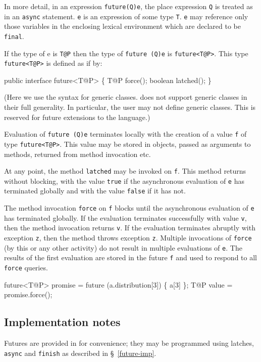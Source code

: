 In more detail, in an expression {\tt future(Q){e}}, the place
expression {\tt Q} is treated as in an {\tt async} statement. {\tt e}
is an expression of some type {\tt T}. {\tt e} may reference only
those variables in the enclosing lexical environment which are
declared to be {\tt final}.

If the type of {\cf e} is {\tt T@P} then the type of
{\tt future (Q){e}} is {\tt future<T@P>}.  This 
type {\tt future<T@P>} is defined as if by:
\begin{x10}
public interface future<T@P> \{
  T@P force();
  boolean latched();
\}
\end{x10}

(Here we use the syntax for generic classes. \XtenCurrVer{} does not support
generic classes in their full generality. In particular, the user may
not define generic classes. This is reserved for future extensions to the
language.)

Evaluation of {\tt future (Q){e}} terminates locally with the creation
of a value {\tt f} of type {\tt future<T@P>}.  This value may be
stored in objects, passed as arguments to methods, returned from
method invocation etc. 

At any point, the method {\tt latched} may be invoked on {\tt f}. This
method returns without blocking, with the value {\tt true} if the
asynchronous evaluation of {\tt e} has terminated globally and with
the value {\tt false} if it has not.

The method invocation {\tt force} on {\tt f} blocks until the
asynchronous evaluation of {\tt e} has terminated globally. If the
evaluation terminates successfully with value {\tt v}, then the method
invocation returns {\tt v}. If the evaluation terminates abruptly with
exception {\tt z}, then the method throws exception {\tt z}. Multiple
invocations of {\tt force} (by this or any other activity) do not
result in multiple evaluations of {\tt e}. The results of the first
evaluation are stored in the future {\tt f} and used to respond to all
{\tt force} queries.

\begin{x10}
future<T@P> promise = future (a.distribution[3]) \{ a[3] \};
T@P value = promise.force();
\end{x10}

\subsection{Implementation notes}
Futures are provided in \Xten{} for convenience; they may be
programmed using latches, {\tt async} and {\tt finish} as
described in \S~\ref{future-imp}.

